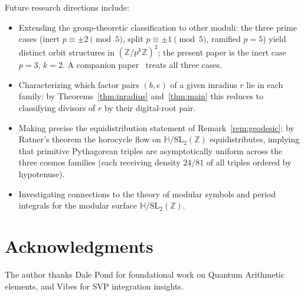 \documentclass[12pt]{article}
\begin{document}
Future research directions include:
\begin{itemize}
\item Extending the group-theoretic classification to other moduli: the three prime cases
  (inert $p\equiv\pm2\pmod5$, split $p\equiv\pm1\pmod5$, ramified $p=5$) yield distinct
  orbit structures in $(\mathbb{Z}/p^k\mathbb{Z})^2$; the present paper is the inert case
  $p=3$, $k=2$.  A companion paper~\cite{modular-dynamics} treats all three cases.
\item Characterizing which factor pairs $(b,e)$ of a given inradius $r$ lie in each
  family: by Theorems~\ref{thm:inradius} and~\ref{thm:main} this reduces to classifying
  divisors of $r$ by their digital-root pair.
\item Making precise the equidistribution statement of Remark~\ref{rem:geodesic}:
  by Ratner's theorem the horocycle flow on $\mathbb{H}/\mathrm{SL}_2(\mathbb{Z})$
  equidistributes, implying that primitive Pythagorean triples are asymptotically
  uniform across the three cosmos families (each receiving density $24/81$ of all
  triples ordered by hypotenuse).
\item Investigating connections to the theory of modular symbols and period integrals
  for the modular surface $\mathbb{H}/\mathrm{SL}_2(\mathbb{Z})$.
\end{itemize}

\section*{Acknowledgments}

The author thanks Dale Pond for foundational work on Quantum Arithmetic elements, and Vibes for SVP integration insights.
\end{document}
